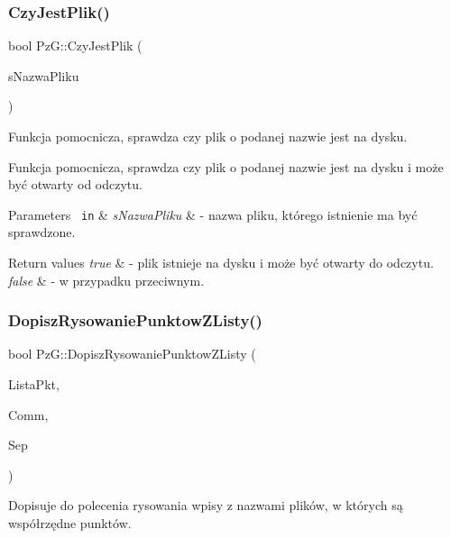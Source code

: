 \subsubsection{\texorpdfstring{CzyJestPlik()}{CzyJestPlik()}}
{\footnotesize\ttfamily bool Pz\+G\+::\+Czy\+Jest\+Plik (\begin{DoxyParamCaption}\item[{char const $\ast$}]{s\+Nazwa\+Pliku }\end{DoxyParamCaption})}



Funkcja pomocnicza, sprawdza czy plik o podanej nazwie jest na dysku. 

Funkcja pomocnicza, sprawdza czy plik o podanej nazwie jest na dysku i może być otwarty od odczytu. 
\begin{DoxyParams}[1]{Parameters}
\mbox{\texttt{ in}}  & {\em s\+Nazwa\+Pliku} & -\/ nazwa pliku, którego istnienie ma być sprawdzone. \\
\hline
\end{DoxyParams}

\begin{DoxyRetVals}{Return values}
{\em true} & -\/ plik istnieje na dysku i może być otwarty do odczytu. \\
\hline
{\em false} & -\/ w przypadku przeciwnym. \\
\hline
\end{DoxyRetVals}
\mbox{\label{namespace_pz_g_a85d3a77f67c2724ba3675bc3ef05eb81}} 
\subsubsection{\texorpdfstring{DopiszRysowaniePunktowZListy()}{DopiszRysowaniePunktowZListy()}}
{\footnotesize\ttfamily bool Pz\+G\+::\+Dopisz\+Rysowanie\+Punktow\+Z\+Listy (\begin{DoxyParamCaption}\item[{\mbox{\hyperlink{namespace_pz_g_a663e923efc195ea10f6f7086c6da490b}{Typ\+Lista\+Punktow}} \&}]{Lista\+Pkt,  }\item[{std\+::string \&}]{Comm,  }\item[{const char $\ast$}]{Sep }\end{DoxyParamCaption})}



Dopisuje do polecenia rysowania wpisy z nazwami plików, w których są współrzędne punktów. 

